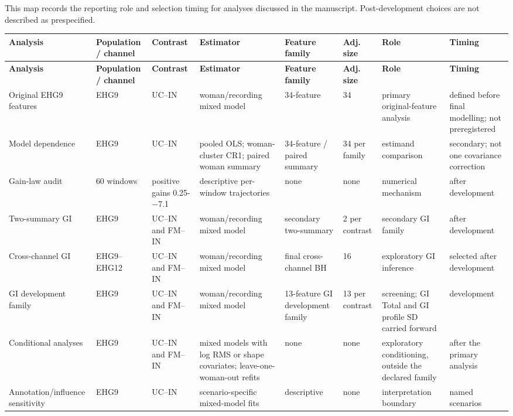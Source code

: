 \documentclass[10pt]{article}
\begin{document}
This map records the reporting role and selection timing for analyses discussed in the manuscript. Post-development choices are not described as prespecified.
\begin{longtable}{p{3.0cm}p{2.7cm}p{2.2cm}p{3.3cm}p{2.7cm}p{1.5cm}p{3.2cm}p{3.3cm}}
\toprule
\textbf{Analysis} & \textbf{Population / channel} & \textbf{Contrast} & \textbf{Estimator} & \textbf{Feature family} & \textbf{Adj. size} & \textbf{Role} & \textbf{Timing} \\
\midrule
\endfirsthead
\toprule
\textbf{Analysis} & \textbf{Population / channel} & \textbf{Contrast} & \textbf{Estimator} & \textbf{Feature family} & \textbf{Adj. size} & \textbf{Role} & \textbf{Timing} \\
\midrule
\endhead
Original EHG9 features & EHG9 & UC--IN & woman/recording mixed model & 34-feature & 34 & primary original-feature analysis & defined before final modelling; not preregistered \\
Model dependence & EHG9 & UC--IN & pooled OLS; woman-cluster CR1; paired woman summary & 34-feature / paired summary & 34 per family & estimand comparison & secondary; not one covariance correction \\
Gain-law audit & 60 windows & positive gains 0.25-$-$7.1 & descriptive per-window trajectories & none & none & numerical mechanism & after development \\
Two-summary GI & EHG9 & UC--IN and FM--IN & woman/recording mixed model & secondary two-summary & 2 per contrast & secondary GI family & after development \\
Cross-channel GI & EHG9--EHG12 & UC--IN and FM--IN & woman/recording mixed model & final cross-channel BH & 16 & exploratory GI inference & selected after development \\
GI development family & EHG9 & UC--IN and FM--IN & woman/recording mixed model & 13-feature GI development family & 13 per contrast & screening; GI Total and GI profile SD carried forward & development \\
Conditional analyses & EHG9 & UC--IN and FM--IN & mixed models with log RMS or shape covariates; leave-one-woman-out refits & none & none & exploratory conditioning, outside the declared family & after the primary analysis \\
Annotation/influence sensitivity & EHG9 & UC--IN & scenario-specific mixed-model fits & descriptive & none & interpretation boundary & named scenarios \\
\bottomrule
\end{longtable}
\end{document}
